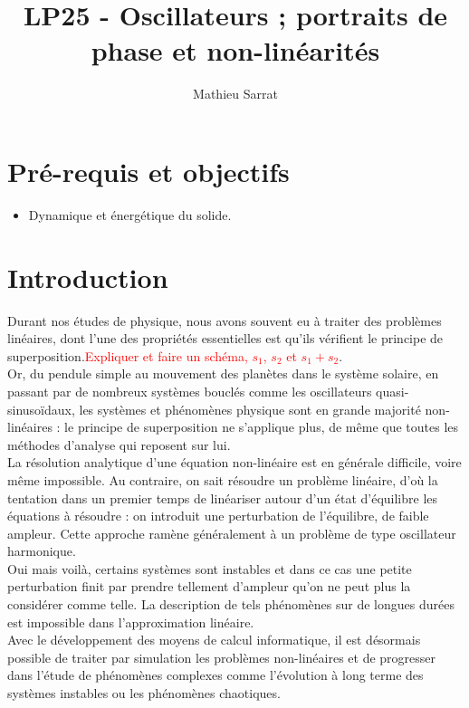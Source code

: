 \documentclass[11pt,a4paper]{report}
\author{Mathieu Sarrat}
\title{LP25 - Oscillateurs ; portraits de phase et non-linéarités}
\begin{document}
\maketitle

\section*{Pré-requis et objectifs}

\begin{itemize}
	\item Dynamique et énergétique du solide.
\end{itemize}

\newpage
\section*{Introduction}

Durant nos études de physique, nous avons souvent eu à traiter des problèmes linéaires, dont l'une des propriétés essentielles est qu'ils vérifient le principe de superposition.\textcolor{red}{Expliquer et faire un schéma, $s_1$, $s_2$ et $s_1 + s_2$}.\\

Or, du pendule simple au mouvement des planètes dans le système solaire, en passant par de nombreux systèmes bouclés comme les oscillateurs quasi-sinusoïdaux, les systèmes et phénomènes physique sont en grande majorité non-linéaires : le principe de superposition ne s'applique plus, de même que toutes les méthodes d'analyse qui reposent sur lui.\\ 

La résolution analytique d'une équation non-linéaire est en générale difficile, voire même impossible. Au contraire, on sait résoudre un problème linéaire, d'où la tentation dans un premier temps de linéariser autour d'un état d'équilibre les équations à résoudre : on introduit une perturbation de l'équilibre, de faible ampleur. Cette approche ramène généralement à un problème de type oscillateur harmonique.\\

Oui mais voilà, certains systèmes sont instables et dans ce cas une petite perturbation finit par prendre tellement d'ampleur qu'on ne peut plus la considérer comme telle. La description de tels phénomènes sur de longues durées est impossible dans l'approximation linéaire.\\

Avec le développement des moyens de calcul informatique, il est désormais possible de traiter par simulation les problèmes non-linéaires et de progresser dans l'étude de phénomènes complexes comme l'évolution à long terme des systèmes instables ou les phénomènes chaotiques.\\
\end{document}
